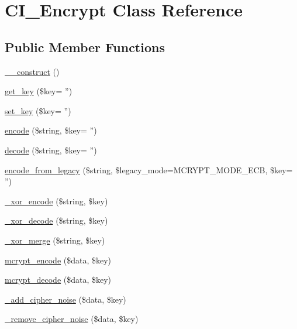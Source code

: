 \hypertarget{class_c_i___encrypt}{\section{C\-I\-\_\-\-Encrypt Class Reference}
\label{class_c_i___encrypt}
}
\subsection*{Public Member Functions}
\begin{DoxyCompactItemize}
\item 
\hyperlink{class_c_i___encrypt_a095c5d389db211932136b53f25f39685}{\-\_\-\-\_\-construct} ()
\item 
\hyperlink{class_c_i___encrypt_aad3fd0de27f6a67b14751b47d2471693}{get\-\_\-key} (\$key= '')
\item 
\hyperlink{class_c_i___encrypt_aec193abfe69c2cb1af185b3ca5754de3}{set\-\_\-key} (\$key= '')
\item 
\hyperlink{class_c_i___encrypt_a3d863b1bc39b9a7865d99df1cdf24df0}{encode} (\$string, \$key= '')
\item 
\hyperlink{class_c_i___encrypt_a60c68c6c16a6082e23386f9ac23518ef}{decode} (\$string, \$key= '')
\item 
\hyperlink{class_c_i___encrypt_a2dffd202d3b3968d905d1012041e6588}{encode\-\_\-from\-\_\-legacy} (\$string, \$legacy\-\_\-mode=M\-C\-R\-Y\-P\-T\-\_\-\-M\-O\-D\-E\-\_\-\-E\-C\-B, \$key= '')
\item 
\hyperlink{class_c_i___encrypt_a6e12266a879a6258c49dbc380aed35ca}{\-\_\-xor\-\_\-encode} (\$string, \$key)
\item 
\hyperlink{class_c_i___encrypt_aa0cee348c5cef9a3a06c22a92c38fd4f}{\-\_\-xor\-\_\-decode} (\$string, \$key)
\item 
\hyperlink{class_c_i___encrypt_aaf2644aeb5ec418eb4ddc2d70f372ada}{\-\_\-xor\-\_\-merge} (\$string, \$key)
\item 
\hyperlink{class_c_i___encrypt_aa1d7e40f65deb526fe4619da65c6b1ec}{mcrypt\-\_\-encode} (\$data, \$key)
\item 
\hyperlink{class_c_i___encrypt_a85f02c928abbbc5a6bf038ea5292324d}{mcrypt\-\_\-decode} (\$data, \$key)
\item 
\hyperlink{class_c_i___encrypt_ada423e99876a54e7bc33afc9899d01a2}{\-\_\-add\-\_\-cipher\-\_\-noise} (\$data, \$key)
\item 
\hyperlink{class_c_i___encrypt_a35c2675b85803d42231d1f8353fa8dac}{\-\_\-remove\-\_\-cipher\-\_\-noise} (\$data, \$key)

\end{DoxyCompactItemize}
